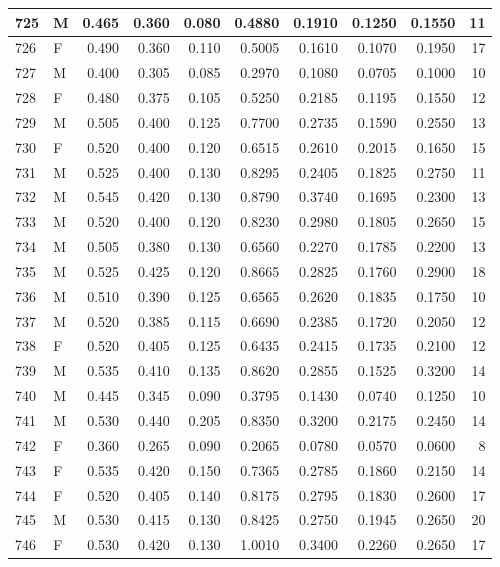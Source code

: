 \documentclass[9pt,twocolumn,twoside,]{pnas-new}
\begin{document}
\begin{tabular}{l|l|r|r|r|r|r|r|r|r}
\hline
725 & M & 0.465 & 0.360 & 0.080 & 0.4880 & 0.1910 & 0.1250 & 0.1550 & 11\\
\hline
726 & F & 0.490 & 0.360 & 0.110 & 0.5005 & 0.1610 & 0.1070 & 0.1950 & 17\\
\hline
727 & M & 0.400 & 0.305 & 0.085 & 0.2970 & 0.1080 & 0.0705 & 0.1000 & 10\\
\hline
728 & F & 0.480 & 0.375 & 0.105 & 0.5250 & 0.2185 & 0.1195 & 0.1550 & 12\\
\hline
729 & M & 0.505 & 0.400 & 0.125 & 0.7700 & 0.2735 & 0.1590 & 0.2550 & 13\\
\hline
730 & F & 0.520 & 0.400 & 0.120 & 0.6515 & 0.2610 & 0.2015 & 0.1650 & 15\\
\hline
731 & M & 0.525 & 0.400 & 0.130 & 0.8295 & 0.2405 & 0.1825 & 0.2750 & 11\\
\hline
732 & M & 0.545 & 0.420 & 0.130 & 0.8790 & 0.3740 & 0.1695 & 0.2300 & 13\\
\hline
733 & M & 0.520 & 0.400 & 0.120 & 0.8230 & 0.2980 & 0.1805 & 0.2650 & 15\\
\hline
734 & M & 0.505 & 0.380 & 0.130 & 0.6560 & 0.2270 & 0.1785 & 0.2200 & 13\\
\hline
735 & M & 0.525 & 0.425 & 0.120 & 0.8665 & 0.2825 & 0.1760 & 0.2900 & 18\\
\hline
736 & M & 0.510 & 0.390 & 0.125 & 0.6565 & 0.2620 & 0.1835 & 0.1750 & 10\\
\hline
737 & M & 0.520 & 0.385 & 0.115 & 0.6690 & 0.2385 & 0.1720 & 0.2050 & 12\\
\hline
738 & F & 0.520 & 0.405 & 0.125 & 0.6435 & 0.2415 & 0.1735 & 0.2100 & 12\\
\hline
739 & M & 0.535 & 0.410 & 0.135 & 0.8620 & 0.2855 & 0.1525 & 0.3200 & 14\\
\hline
740 & M & 0.445 & 0.345 & 0.090 & 0.3795 & 0.1430 & 0.0740 & 0.1250 & 10\\
\hline
741 & M & 0.530 & 0.440 & 0.205 & 0.8350 & 0.3200 & 0.2175 & 0.2450 & 14\\
\hline
742 & F & 0.360 & 0.265 & 0.090 & 0.2065 & 0.0780 & 0.0570 & 0.0600 & 8\\
\hline
743 & F & 0.535 & 0.420 & 0.150 & 0.7365 & 0.2785 & 0.1860 & 0.2150 & 14\\
\hline
744 & F & 0.520 & 0.405 & 0.140 & 0.8175 & 0.2795 & 0.1830 & 0.2600 & 17\\
\hline
745 & M & 0.530 & 0.415 & 0.130 & 0.8425 & 0.2750 & 0.1945 & 0.2650 & 20\\
\hline
746 & F & 0.530 & 0.420 & 0.130 & 1.0010 & 0.3400 & 0.2260 & 0.2650 & 17\\

\end{tabular}
\end{document}
